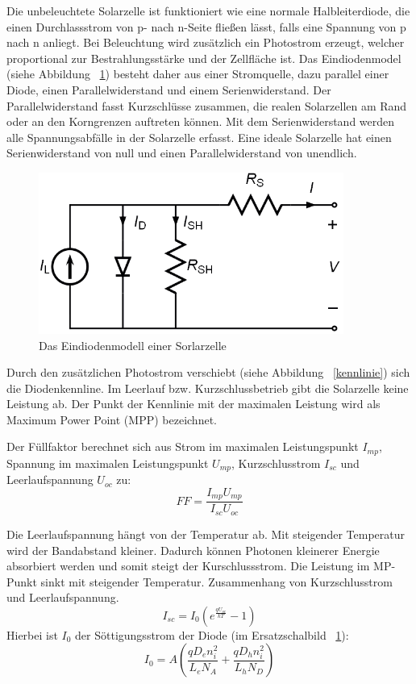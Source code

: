 \documentclass[a4paper,bibtotoc,oneside]{scrbook}
\begin{document}
Die unbeleuchtete Solarzelle ist funktioniert wie eine normale Halbleiterdiode, die einen Durchlassstrom von p- nach n-Seite fließen lässt, falls eine Spannung von p nach n anliegt. Bei Beleuchtung wird zusätzlich ein Photostrom erzeugt, welcher proportional zur Bestrahlungsstärke und der Zellfläche ist. Das Eindiodenmodel (siehe Abbildung ~\ref{esb}) besteht daher aus einer Stromquelle, dazu parallel einer Diode, einen Parallelwiderstand und einem Serienwiderstand. Der Parallelwiderstand fasst Kurzschlüsse zusammen, die realen Solarzellen am Rand oder an den Korngrenzen auftreten können. Mit dem Serienwiderstand werden alle Spannungsabfälle in der Solarzelle erfasst. Eine ideale Solarzelle hat einen Serienwiderstand von null und einen Parallelwiderstand von unendlich. 
\begin{figure}[htbp]
\centering
\includegraphics[width=100mm]{img/esb.png}
\caption{Das Eindiodenmodell einer Sorlarzelle}\label{esb}
\end{figure}

Durch den zusätzlichen Photostrom verschiebt (siehe Abbildung ~\ref{kennlinie}) sich die Diodenkennline. Im Leerlauf  bzw. Kurzschlussbetrieb gibt die Solarzelle keine Leistung ab. Der Punkt der Kennlinie mit der maximalen Leistung wird als Maximum Power Point (MPP) bezeichnet.

Der Füllfaktor berechnet sich aus Strom im maximalen Leistungspunkt $I_{mp}$, Spannung im maximalen Leistungspunkt $U_{mp}$, Kurzschlusstrom $I_{sc}$ und Leerlaufspannung $U_{oc}$ zu:
  \begin{equation}
     FF = \frac {I_{mp} U_{mp}} {I_{sc} U_{oc}}
  \end{equation}
  
Die Leerlaufspannung hängt von der Temperatur ab. Mit steigender Temperatur wird der Bandabstand kleiner. Dadurch können Photonen kleinerer Energie absorbiert werden und somit steigt der Kurschlussstrom. Die Leistung im MP-Punkt sinkt mit steigender Temperatur.
Zusammenhang von Kurzschlusstrom und Leerlaufspannung.
  \begin{equation}
     I_{sc} = I_0 ( e^{\frac {q U_{oc}}{k T}} - 1 )
  \end{equation}
  Hierbei ist $I_{0}$ der Söttigungsstrom der Diode (im Ersatzschalbild ~\ref{esb}):
    \begin{equation}
     I_{0} = A ( \frac { q D_{e} n_i^2} {L_e N_A} + \frac {q D_h n_i^2} {L_h N_D})
  \end{equation}
  
\end{document}
